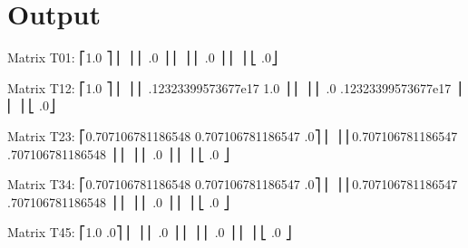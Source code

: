 \documentclass[letterpaper,10pt,english,openany,oneside]{sphinxmanual}
\begin{document}
\section{Output}
\label{\detokenize{Inverse_Kinematics:output}}
%
\begin{sphinxVerbatim}[commandchars=\\\{\},numbers=left,firstnumber=1,stepnumber=1]
  Matrix T01:
  ⎡1.0            ⎤
  ⎢                  ⎥
  ⎢    .0        ⎥
  ⎢                  ⎥
  ⎢        .0    ⎥
  ⎢                  ⎥
  ⎣            .0⎦

  Matrix T12:
  ⎡1.0                                              ⎤
  ⎢                                                    ⎥
  ⎢    .12323399573677e\PYGZhy{}17          \PYGZhy{}1.0            ⎥
  ⎢                                                    ⎥
  ⎢            .0           .12323399573677e\PYGZhy{}17    ⎥
  ⎢                                                    ⎥
  ⎣                                              .0⎦

  Matrix T23:
  ⎡0.707106781186548  \PYGZhy{}0.707106781186547      .0⎤
  ⎢                                                 ⎥
  ⎢0.707106781186547  .707106781186548           ⎥
  ⎢                                                 ⎥
  ⎢                                     .0      ⎥
  ⎢                                                 ⎥
  ⎣                                          .0 ⎦

  Matrix T34:
  ⎡0.707106781186548  \PYGZhy{}0.707106781186547      .0⎤
  ⎢                                                 ⎥
  ⎢0.707106781186547  .707106781186548           ⎥
  ⎢                                                 ⎥
  ⎢                                     .0      ⎥
  ⎢                                                 ⎥
  ⎣                                          .0 ⎦

  Matrix T45:
  ⎡1.0          .0⎤
  ⎢                    ⎥
  ⎢    .0          ⎥
  ⎢                    ⎥
  ⎢        .0      ⎥
  ⎢                    ⎥
  ⎣             .0 ⎦


\end{sphinxVerbatim}
\end{document}
